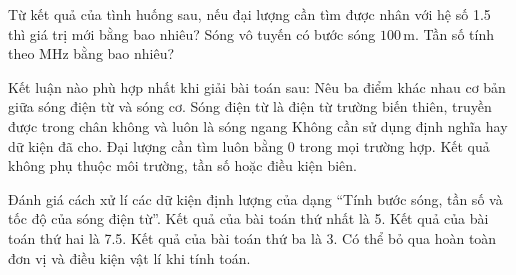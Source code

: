 \begin{ex}
Từ kết quả của tình huống sau, nếu đại lượng cần tìm được nhân với hệ số 1.5 thì giá trị mới bằng bao nhiêu? Sóng vô tuyến có bước sóng $100\,\text{m}$. Tần số tính theo MHz bằng bao nhiêu?
\end{ex}

\begin{ex}
Kết luận nào phù hợp nhất khi giải bài toán sau: Nêu ba điểm khác nhau cơ bản giữa sóng điện từ và sóng cơ.
\choice
{\True Sóng điện từ là điện từ trường biến thiên, truyền được trong chân không và luôn là sóng ngang}
{Không cần sử dụng định nghĩa hay dữ kiện đã cho.}
{Đại lượng cần tìm luôn bằng 0 trong mọi trường hợp.}
{Kết quả không phụ thuộc môi trường, tần số hoặc điều kiện biên.}
\end{ex}

\begin{ex}
Đánh giá cách xử lí các dữ kiện định lượng của dạng “Tính bước sóng, tần số và tốc độ của sóng điện từ”.
\choiceTF
{\True Kết quả của bài toán thứ nhất là 5.}
{\True Kết quả của bài toán thứ hai là 7.5.}
{\True Kết quả của bài toán thứ ba là 3.}
{Có thể bỏ qua hoàn toàn đơn vị và điều kiện vật lí khi tính toán.}
\end{ex}

